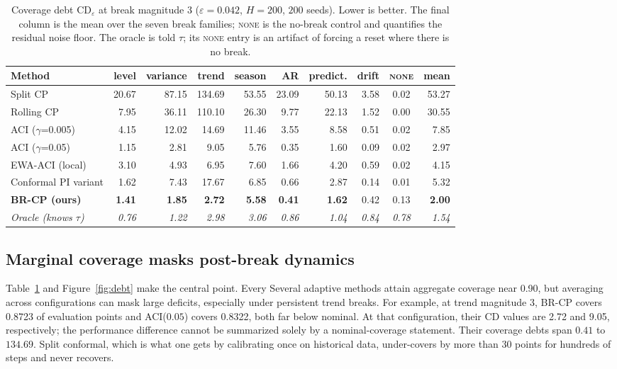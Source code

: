 \documentclass[10pt]{article}
\newcommand{\brcp}{\textsc{BR-CP}}
\begin{document}
\begin{table}[t]
\centering
\small
\caption{Coverage debt $\mathrm{CD}_\varepsilon$ at break magnitude $3$
($\varepsilon = 0.042$, $H=200$, $200$ seeds). Lower is better. The final
column is the mean over the seven break families; \textsc{none} is the
no-break control and quantifies the residual noise floor. The oracle is told
$\tau$; its \textsc{none} entry is an artifact of forcing a reset where there
is no break.}
\label{tab:cd}
\begin{tabular}{lrrrrrrrcr}
\toprule
Method & level & variance & trend & season & AR & predict. & drift &
\textsc{none} & \textbf{mean} \\
\midrule
Split CP & 20.67 & 87.15 & 134.69 & 53.55 & 23.09 & 50.13 & 3.58 & 0.02 & 53.27 \\
Rolling CP & 7.95 & 36.11 & 110.10 & 26.30 & 9.77 & 22.13 & 1.52 & 0.00 & 30.55 \\
ACI ($\gamma$=0.005)& 4.15 & 12.02 & 14.69 & 11.46 & 3.55 & 8.58 & 0.51 & 0.02 & 7.85 \\
ACI ($\gamma$=0.05) & 1.15 & 2.81 & 9.05 & 5.76 & 0.35 & 1.60 & 0.09 & 0.02 & 2.97 \\
EWA-ACI (local) & 3.10 & 4.93 & 6.95 & 7.60 & 1.66 & 4.20 & 0.59 & 0.02 & 4.15 \\
Conformal PI variant & 1.62 & 7.43 & 17.67 & 6.85 & 0.66 & 2.87 & 0.14 & 0.01 & 5.32 \\
\textbf{\brcp{} (ours)} & \textbf{1.41} & \textbf{1.85} & \textbf{2.72} &
 \textbf{5.58} & \textbf{0.41} & \textbf{1.62} & 0.42 & 0.13 & \textbf{2.00} \\
\midrule
\textit{Oracle (knows $\tau$)} & \textit{0.76} & \textit{1.22} & \textit{2.98} &
 \textit{3.06} & \textit{0.86} & \textit{1.04} & \textit{0.84} & \textit{0.78} &
 \textit{1.54} \\
\bottomrule
\end{tabular}
\end{table}

\subsection{Marginal coverage masks post-break dynamics}

Table~\ref{tab:cd} and Figure~\ref{fig:debt} make the central point. Every
Several adaptive methods attain aggregate coverage near 0.90, but averaging across configurations can mask large deficits, especially under persistent trend breaks. For example, at trend magnitude 3, \brcp{} covers 0.8723 of evaluation points and ACI($0.05$) covers 0.8322, both far below nominal. At that configuration, their CD values are 2.72 and 9.05, respectively; the performance difference cannot be summarized solely by a nominal-coverage statement. Their coverage debts span $0.41$ to $134.69$.
Split conformal, which is what one gets by calibrating once on historical data,
under-covers by more than $30$ points for hundreds of steps and never recovers.
\end{document}
